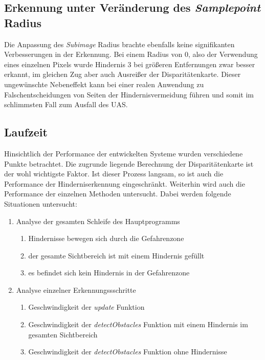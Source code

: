 \subsection{Erkennung unter Veränderung des \emph{Samplepoint }Radius}
\label{subsec:radius_change_discussion}
\noindent
Die Anpassung des \emph{Subimage} Radius brachte ebenfalls keine signifikanten Verbesserungen in der Erkennung. Bei einem Radius von 0, also der Verwendung eines einzelnen Pixels wurde Hindernis 3 bei größeren Entfernungen zwar besser erkannt, im gleichen Zug aber auch Ausreißer der Disparitätenkarte. Dieser ungewünschte Nebeneffekt kann bei einer realen Anwendung zu Falschentscheidungen von Seiten der Hindernisvermeidung führen und somit im schlimmsten Fall zum Ausfall des UAS. 



\subsection{Laufzeit}
\label{subsec:discussion_performance}

Hinsichtlich der Performance der entwickelten Systeme wurden verschiedene Punkte betrachtet. Die zugrunde liegende Berechnung der Disparitätenkarte ist der wohl wichtigste Faktor. Ist dieser Prozess langsam, so ist auch die Performance der Hinderniserkennung eingeschränkt. Weiterhin wird auch die Performance der einzelnen Methoden untersucht. Dabei werden folgende Situationen untersucht:
\begin{enumerate}
	\item Analyse der gesamten Schleife des Hauptprogramms
	\begin{enumerate}
		\item Hindernisse bewegen sich durch die Gefahrenzone
		\item der gesamte Sichtbereich ist mit einem Hindernis gefüllt
		\item es befindet sich kein Hindernis in der Gefahrenzone
	\end{enumerate}
	\item Analyse einzelner Erkennungssschritte
	\begin{enumerate}
		\item Geschwindigkeit der \emph{update} Funktion
		\item Geschwindigkeit der \emph{detectObstacles} Funktion mit einem Hindernis im gesamten Sichtbereich
		\item Geschwindigkeit der \emph{detectObstacles} Funktion ohne Hindernisse
	\end{enumerate}
\end{enumerate}

